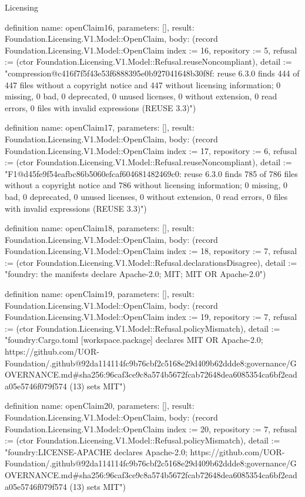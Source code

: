 \begin{lexlean}{Licensing}
\begin{semanticmodule}
definition{
  name: openClaim16,
  parameters: [],
  result: Foundation.Licensing.V1.Model::OpenClaim,
  body: (record Foundation.Licensing.V1.Model::OpenClaim {index := 16, repository := 5, refusal := (ctor Foundation.Licensing.V1.Model::Refusal.reuseNoncompliant), detail := "compression@c416f7f5f43e53f6888395e0b927041648b30f8f: reuse 6.3.0 finds 444 of 447 files without a copyright notice and 447 without licensing information; 0 missing, 0 bad, 0 deprecated, 0 unused licenses, 0 without extension, 0 read errors, 0 files with invalid expressions (REUSE 3.3)"})
}

definition{
  name: openClaim17,
  parameters: [],
  result: Foundation.Licensing.V1.Model::OpenClaim,
  body: (record Foundation.Licensing.V1.Model::OpenClaim {index := 17, repository := 6, refusal := (ctor Foundation.Licensing.V1.Model::Refusal.reuseNoncompliant), detail := "F1@d45fe9f54eafbc86b5060efcaf604681482469c0: reuse 6.3.0 finds 785 of 786 files without a copyright notice and 786 without licensing information; 0 missing, 0 bad, 0 deprecated, 0 unused licenses, 0 without extension, 0 read errors, 0 files with invalid expressions (REUSE 3.3)"})
}

definition{
  name: openClaim18,
  parameters: [],
  result: Foundation.Licensing.V1.Model::OpenClaim,
  body: (record Foundation.Licensing.V1.Model::OpenClaim {index := 18, repository := 7, refusal := (ctor Foundation.Licensing.V1.Model::Refusal.declarationsDisagree), detail := "foundry: the manifests declare Apache-2.0; MIT; MIT OR Apache-2.0"})
}

definition{
  name: openClaim19,
  parameters: [],
  result: Foundation.Licensing.V1.Model::OpenClaim,
  body: (record Foundation.Licensing.V1.Model::OpenClaim {index := 19, repository := 7, refusal := (ctor Foundation.Licensing.V1.Model::Refusal.policyMismatch), detail := "foundry:Cargo.toml [workspace.package] declares MIT OR Apache-2.0; https://github.com/UOR-Foundation/.github@92da114114fc9b76cbf2c5168e29d409b62ddde8:governance/GOVERNANCE.md#sha256:96caf3ce9c8a574b5672fcab72648dea6085354ca6bf2eada05e5746f079f574 (13) sets MIT"})
}

definition{
  name: openClaim20,
  parameters: [],
  result: Foundation.Licensing.V1.Model::OpenClaim,
  body: (record Foundation.Licensing.V1.Model::OpenClaim {index := 20, repository := 7, refusal := (ctor Foundation.Licensing.V1.Model::Refusal.policyMismatch), detail := "foundry:LICENSE-APACHE declares Apache-2.0; https://github.com/UOR-Foundation/.github@92da114114fc9b76cbf2c5168e29d409b62ddde8:governance/GOVERNANCE.md#sha256:96caf3ce9c8a574b5672fcab72648dea6085354ca6bf2eada05e5746f079f574 (13) sets MIT"})
}


\end{semanticmodule}
\end{lexlean}
